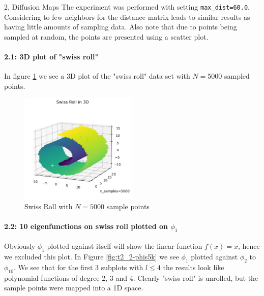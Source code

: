 \begin{task}{2, Diffusion Maps}
The experiment was performed with setting \verb|max_dist=60.0|. Considering to few neighbors for the distance matrix leads to similar results as having little amounts of sampling data. Also note that due to points being sampled at random, the points are presented using a scatter plot.

\paragraph{2.1: 3D plot of "swiss roll"}
In figure \ref{fig:t2_2-swissroll} we see a 3D plot of the "swiss roll" data set with $N=5000$ sampled points. 

\begin{figure}[H]
\centering
\includegraphics[width=0.5\textwidth]{images_task2/t2_2-swissroll5k.png}
\caption{Swiss Roll with $N=5000$ sample points}
\label{fig:t2_2-swissroll}
\end{figure}

\paragraph{2.2: 10 eigenfunctions on swiss roll plotted on $\phi_1$}
Obviously $\phi_1$ plotted against itself will show the linear function $f(x) = x$, hence we excluded this plot. In Figure \ref{fig:t2_2-phis5k} we see $\phi_1$ plotted against $\phi_2$ to $\phi_{10}$. We see that for the first 3 subplots with $l\leq 4$ the results look like polynomial functions of degree 2, 3 and 4. Clearly "swiss-roll" is unrolled, but the sample points were mapped into a 1D space.


\end{task}
